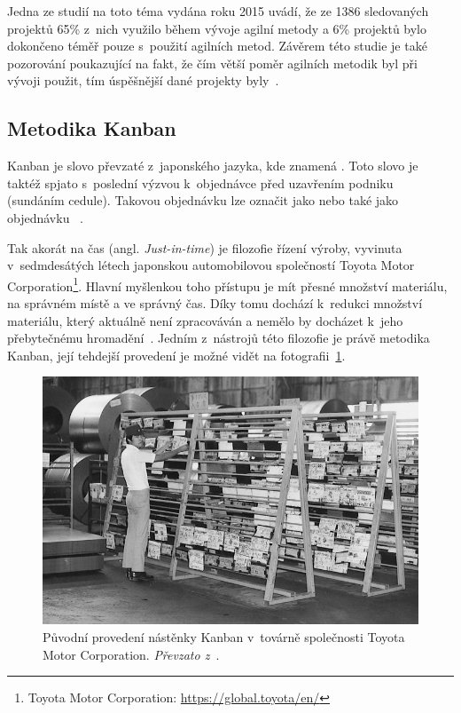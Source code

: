 Jedna ze studií na toto téma vydána roku 2015 uvádí, že ze 1386 sledovaných projektů 65\% z~nich využilo během vývoje agilní metody a 6\% projektů bylo dokončeno téměř pouze s~použití agilních metod. Závěrem této studie je také pozorování poukazující na fakt, že čím větší poměr agilních metodik byl při vývoji použit, tím úspěšnější dané projekty byly~\cite{bib:agile-work}.

\subsection{Metodika Kanban}
Kanban je slovo převzaté z~japonského jazyka, kde znamená . Toto slovo je taktéž spjato s~poslední výzvou k~objednávce před uzavřením podniku (sundáním cedule). Takovou objednávku lze označit jako  nebo také jako objednávku ~\cite{bib:dict-kanban}. 

Tak akorát na čas (angl. \emph{Just-in-time}) je filozofie řízení výroby, vyvinuta v~sedmdesátých létech japonskou automobilovou společností Toyota Motor Corporation\footnote{Toyota Motor Corporation: \url{https://global.toyota/en/}}. Hlavní myšlenkou toho přístupu je mít přesné množství materiálu, na správném místě a ve správný čas. Díky tomu dochází k~redukci množství materiálu, který aktuálně není zpracováván a nemělo by docházet k~jeho přebytečnému hromadění~\cite{bib:just-in-time}. Jedním z~nástrojů této filozofie je právě metodika Kanban, její tehdejší provedení je možné vidět na fotografii~\ref{img:kanban-toyota}.

\begin{figure}[H]
	\centering
	\includegraphics[width=\textwidth]{obrazky-figures/toyota-kanban.jpg}
	\caption{Původní provedení nástěnky Kanban v~továrně společnosti Toyota Motor Corporation. \emph{Převzato z~\cite{bib:toyota-history}}.}
	\label{img:kanban-toyota}
\end{figure}

